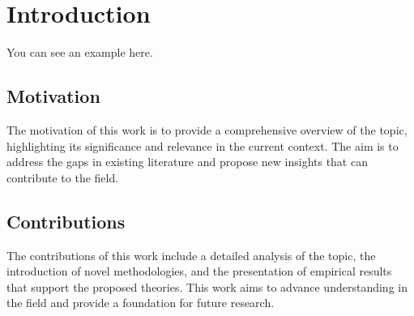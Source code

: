 \section{Introduction}

You can see an example here. \cite{yi2025}

\subsection{Motivation}

The motivation of this work is to provide a comprehensive overview of the topic, highlighting its significance and relevance in the current context. The aim is to address the gaps in existing literature and propose new insights that can contribute to the field.

\subsection{Contributions}

The contributions of this work include a detailed analysis of the topic, the introduction of novel methodologies, and the presentation of empirical results that support the proposed theories. This work aims to advance understanding in the field and provide a foundation for future research.

\pagebreak

